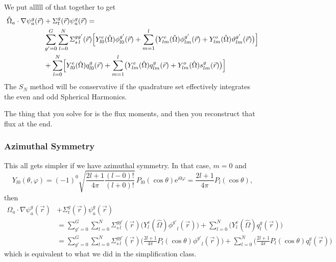 \documentclass[12pt]{article}
\newcommand{\Macro}{\ensuremath{\Sigma}}
\newcommand{\vecr}{\ensuremath{\vec{r}}}
\newcommand{\vOmega}{\ensuremath{\hat{\Omega}}}
\newcommand{\evenp}{\ensuremath{\phi^{g'}}}
\newcommand{\oddp}{\ensuremath{\vartheta^{g'}}}
\newcommand{\sigg}[1]{\ensuremath{\Macro^{gg'}_{s\,#1}}}
\begin{document}
We put alllll of that together to get
\begin{align*}
\vOmega_a \cdot \nabla \psi^g_a(\vecr) &+ \Sigma^g_t(\vecr)\psi^g_a(\vecr) = \\
&\sum_{g'=0}^G
  \sum_{l=0}^N
  \sigg{l}(\vec{r})
  \Bigl[
  Y^e_{l0}(\vOmega)\evenp_{l0}(\vec{r}) +
  \sum_{m=1}^l
  \bigl(
  Y^e_{lm}(\vOmega)\evenp_{lm}(\vec{r}) +
  Y^o_{lm}(\vOmega)\oddp_{lm}(\vec{r})
  \bigr)\Bigr]\\
&+\sum_{l=0}^{N}\Bigl[
  Y^e_{l0}(\vOmega)q^g_{l0}(\vec{r}) +
  \sum_{m=1}^{l}
  \bigr(
  Y^e_{lm}(\vOmega)q^g_{lm}(\vec{r}) + Y^o_{lm}(\vOmega)s^g_{lm}(\vec{r})\bigr)
  \Bigr]
\end{align*}
The $S_N$ method will be conservative if the quadrature set effectively
integrates the even and odd Spherical Harmonics.

The thing that you solve for is the flux moments, and then you reconstruct that flux at the end.

\subsubsection*{Azimuthal Symmetry}
This all gets simpler if we have azimuthal symmetry. In that case, $m=0$ and 
\[
  Y_{l0}(\theta,\varphi) = (-1)^0\sqrt
  {
    \frac{2l+1}{4\pi}\frac{(l-0)!}{(l+0)!}
  }\,
  P_{l0}(\cos\theta)\mathrm{e}^{i0\varphi} = \frac{2l+1}{4\pi}P_{l}(\cos\theta),
\]
then 
\begin{align*}
\vOmega_a \cdot \nabla \psi^g_a(\vecr) &+ \Sigma^g_t(\vecr)\psi^g_a(\vecr)  \\
&=\sum_{g'=0}^G
  \sum_{l=0}^N
  \sigg{l}(\vec{r})
  \bigl(
  Y^e_{l}(\vOmega) \evenp_{l}(\vec{r}) \bigr)
+\sum_{l=0}^{N}\bigl(
  Y^e_{l}(\vOmega)q^g_{l}(\vecr)\bigr)\\
 &=\sum_{g'=0}^G
  \sum_{l=0}^N \sigg{l}(\vec{r})\bigl(\frac{2l+1}{4\pi}P_{l}(\cos\theta)\evenp_{l}(\vec{r}) \bigr)
  + \sum_{l=0}^{N}\bigl(\frac{2l+1}{4\pi}P_{l}(\cos\theta)q^g_{l}(\vecr)\bigr)
\end{align*}
which is equivalent to what we did in the simplification class.
\end{document}
